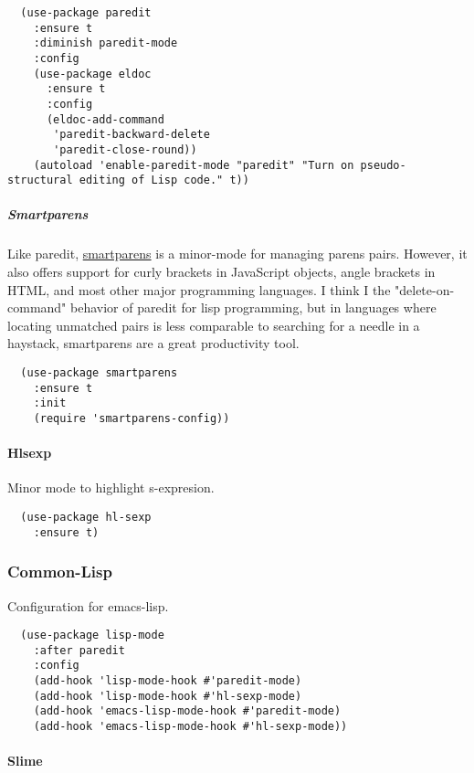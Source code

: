\documentclass[11pt]{article}
\begin{document}
\begin{verbatim}
  (use-package paredit
    :ensure t
    :diminish paredit-mode
    :config
    (use-package eldoc
      :ensure t
      :config
      (eldoc-add-command
       'paredit-backward-delete
       'paredit-close-round))
    (autoload 'enable-paredit-mode "paredit" "Turn on pseudo-structural editing of Lisp code." t))
\end{verbatim}

\subparagraph*{Smartparens}
\label{sec:orgc8c55c7}

Like paredit, \href{https://github.com/Fuco1/smartparens}{smartparens} is a minor-mode for managing parens
pairs. However, it also offers support for curly brackets in
JavaScript objects, angle brackets in HTML, and most other major
programming languages. I think I the "delete-on-command" behavior of
paredit for lisp programming, but in languages where locating
unmatched pairs is less comparable to searching for a needle in a
haystack, smartparens are a great productivity tool.

\begin{verbatim}
  (use-package smartparens
    :ensure t
    :init
    (require 'smartparens-config))
\end{verbatim}

\paragraph*{Hlsexp}
\label{sec:org654795a}

Minor mode to highlight s-expresion.

\begin{verbatim}
  (use-package hl-sexp
    :ensure t)
\end{verbatim}

\subsubsection*{Common-Lisp}
\label{sec:org79e9913}

Configuration for emacs-lisp.

\begin{verbatim}
  (use-package lisp-mode
    :after paredit
    :config
    (add-hook 'lisp-mode-hook #'paredit-mode)
    (add-hook 'lisp-mode-hook #'hl-sexp-mode)
    (add-hook 'emacs-lisp-mode-hook #'paredit-mode)
    (add-hook 'emacs-lisp-mode-hook #'hl-sexp-mode))
\end{verbatim}

\paragraph*{Slime}
\label{sec:orga51e41e}
\end{document}
